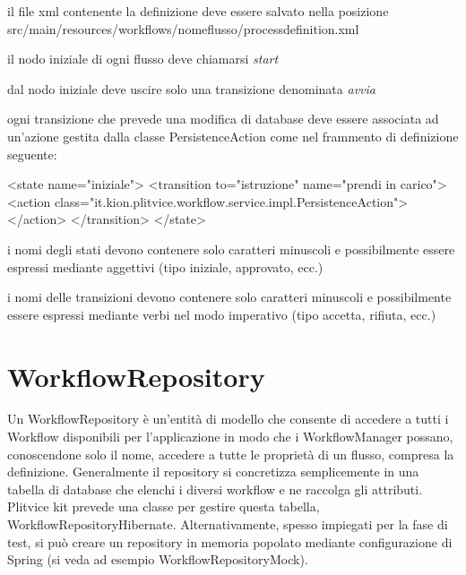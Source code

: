 \begin{itemize*}
\item il file xml contenente la definizione deve essere salvato nella posizione  src/main/resources/workflows/nomeflusso/processdefinition.xml

\item il nodo iniziale di ogni flusso deve chiamarsi \textit{start} 

\item dal nodo iniziale deve uscire solo una transizione denominata \textit{avvia}

\item ogni transizione che prevede una modifica di database deve essere associata ad un'azione gestita dalla classe PersistenceAction come nel frammento di definizione seguente:
\begin{xml}
<state name="iniziale">
    <transition to="istruzione" name="prendi in carico">
      <action class="it.kion.plitvice.workflow.service.impl.PersistenceAction"></action>
    </transition>
  </state>
\end{xml}

\item i nomi degli stati devono contenere solo caratteri minuscoli e possibilmente essere espressi mediante aggettivi (tipo iniziale, approvato, ecc.)

\item i nomi delle transizioni devono contenere solo caratteri minuscoli e possibilmente essere espressi mediante verbi nel modo imperativo (tipo accetta, rifiuta, ecc.)

\end{itemize*}


\section{WorkflowRepository}
Un WorkflowRepository è un'entità di modello che consente di accedere a tutti i Workflow disponibili per l'applicazione in modo che i WorkflowManager possano, conoscendone solo il nome, accedere a tutte le proprietà di un flusso, compresa la definizione. 
Generalmente il repository si concretizza semplicemente in una tabella di database che elenchi i diversi workflow e ne raccolga gli attributi. Plitvice kit prevede una classe per gestire questa tabella,  WorkflowRepositoryHibernate.
Alternativamente, spesso impiegati per la fase di test, si può creare un repository in memoria popolato mediante configurazione di Spring (si veda ad esempio WorkflowRepositoryMock).

